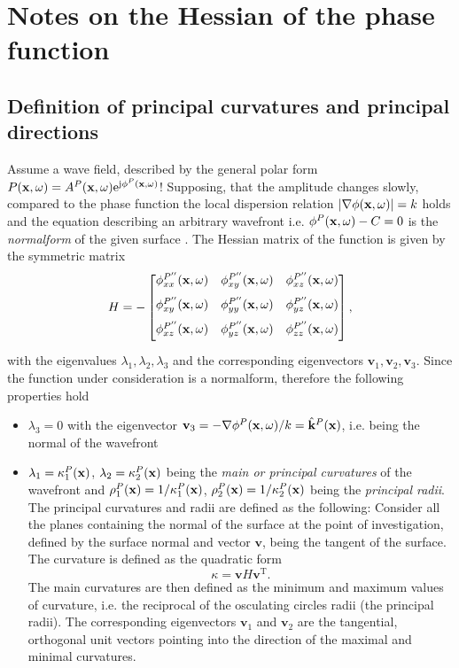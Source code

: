 \section{Notes on the Hessian of the phase function}
\label{App:Hessian}

\subsection{Definition of principal curvatures and principal directions}
Assume a wave field, described by the general polar form $P(\mathbf{x},\omega) = A^P(\mathbf{x},\omega)\mathrm{e}^{\mathrm{j} \phi^P (\mathbf{x},\omega)}$!
Supposing, that the amplitude changes slowly, compared to the phase function the local dispersion relation $| \nabla \phi(\mathbf{x},\omega) |= k$ holds and the equation describing an arbitrary wavefront i.e. $\phi^P(\mathbf{x},\omega) - C = 0$ is the \emph{normalform} of the given surface \cite{Hartmann1999}.
The Hessian matrix of the function is given by the symmetric matrix 
\begin{equation}
H = - \begin{bmatrix} 
\phi^{P''}_{xx}(\mathbf{x},\omega) & \phi^{P''}_{xy}(\mathbf{x},\omega) & \phi^{P''}_{xz}(\mathbf{x},\omega) \\[.7em]
\phi^{P''}_{xy}(\mathbf{x},\omega) & \phi^{P''}_{yy}(\mathbf{x},\omega) & \phi^{P''}_{yz}(\mathbf{x},\omega) \\[.7em]
\phi^{P''}_{xz}(\mathbf{x},\omega) & \phi^{P''}_{yz}(\mathbf{x},\omega) & \phi^{P''}_{zz}(\mathbf{x},\omega) \\[0.5em]    \end{bmatrix},
\end{equation}
with the eigenvalues $\lambda_1, \lambda_2, \lambda_3$ and the corresponding eigenvectors $\mathbf{v}_1, \mathbf{v}_2, \mathbf{v}_3$.
Since the function under consideration is a normalform, therefore the following properties hold
\begin{itemize}
\item $\lambda_3 = 0$ with the eigenvector $\mathbf{v}_3 = - \nabla \phi^P(\mathbf{x},\omega) /k = \hat{\mathbf{k}}^P(\mathbf{x})$, i.e. being the normal of the wavefront
\item $\lambda_1 = \kappa^P_1(\mathbf{x})$, $\lambda_2 = \kappa^P_2(\mathbf{x})$ being the \emph{main or principal curvatures} of the wavefront and $\rho^P_1(\mathbf{x}) = 1/\kappa^P_1(\mathbf{x})$, $\rho^P_2(\mathbf{x}) = 1/\kappa^P_2(\mathbf{x})$ being the \emph{principal radii}.
The principal curvatures and radii are defined as the following:
Consider all the planes containing the normal of the surface at the point of investigation, defined by the surface normal and vector $\mathbf{v}$, being the tangent of the surface.
The curvature is defined as the quadratic form 
\begin{equation}
\kappa = \mathbf{v} H \mathbf{v}^{\mathrm{T}}.
\label{Eq:App:curvature_def}
\end{equation}
The main curvatures are then defined as the minimum and maximum values of curvature, i.e. the reciprocal of the osculating circles radii (the principal radii).
The corresponding eigenvectors $\mathbf{v}_1$ and $\mathbf{v}_2$ are the tangential, orthogonal unit vectors pointing into the direction of the maximal and minimal curvatures.
\end{itemize}

